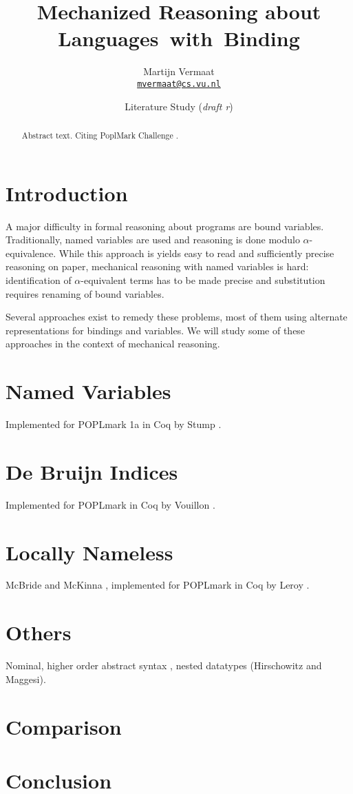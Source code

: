 \documentclass[a4paper,11pt]{article}
\title{Mechanized Reasoning about Languages~with~Binding}
\author{
  Martijn Vermaat\\[0.3em]
  \href{mailto:mvermaat@cs.vu.nl}{\texttt{mvermaat@cs.vu.nl}}
}
\date{Literature Study (\emph{draft r\svnrev})}
\begin{document}
\maketitle


\begin{abstract}
  Abstract text. Citing PoplMark Challenge \cite{Poplmark-Challenge-05}.
\end{abstract}


\section{Introduction}\label{sec:introduction}

A major difficulty in formal reasoning about programs are bound variables.
Traditionally, named variables are used and reasoning is done modulo $\alpha$-equivalence.
While this approach is yields easy to read and sufficiently precise reasoning on paper,
mechanical reasoning with named variables is hard:
identification of $\alpha$-equivalent terms has to be made precise and substitution requires renaming of bound variables.

Several approaches exist to remedy these problems, most of them using alternate representations for bindings and variables.
We will study some of these approaches in the context of mechanical reasoning.


\section{Named Variables}\label{sec:named}

Implemented for POPLmark 1a in Coq by Stump \cite{Stump-05}.


\section{De Bruijn Indices}\label{sec:debruijn}

Implemented for POPLmark in Coq by Vouillon \cite{Vouillon-05}.


\section{Locally Nameless}\label{sec:locally-nameless}

McBride and McKinna \cite{McBride-McKinna-04}, implemented for POPLmark in Coq by Leroy \cite{Leroy-07}.


\section{Others}\label{sec:others}

Nominal, higher order abstract syntax \cite{Capretta-Felty-06}, nested datatypes (Hirschowitz and Maggesi).


\section{Comparison}\label{sec:comparison}


\section{Conclusion}\label{sec:conclusion}


\nocite{*}


\end{document}
